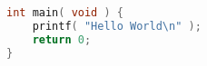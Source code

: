 \begin{lstfloat}
\begin{lstlisting}[language=C, caption={Ukázkový blok kódu}, label={sample:code}]
int main( void ) {
    printf( "Hello World\n" );
    return 0;
}
\end{lstlisting}
\end{lstfloat}